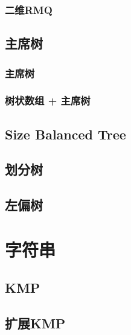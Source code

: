 \documentclass[a4paper, 12pt, twoside]{article}
\begin{document}
\subsubsection{二维RMQ}


\subsection{主席树}
\subsubsection{主席树}

\subsubsection{树状数组 + 主席树}


\subsection{Size Balanced Tree}


\subsection{划分树}


\subsection{左偏树}


\section{字符串}
\subsection{KMP}


\subsection{扩展KMP}

\end{document}

